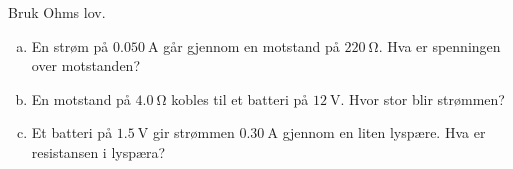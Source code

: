 %
Bruk Ohms lov.
\begin{enumerate}[a)]
    \item En strøm på $\SI{0.050}{\ampere}$ går gjennom en motstand på $\SI{220}{\ohm}$. Hva er spenningen over motstanden?
    \item En motstand på $\SI{4.0}{\ohm}$ kobles til et batteri på $\SI{12}{\volt}$. Hvor stor blir strømmen?
    \item Et batteri på $\SI{1.5}{\volt}$ gir strømmen $\SI{0.30}{\ampere}$ gjennom en liten lyspære. Hva er resistansen i lyspæra?
\end{enumerate}
%
